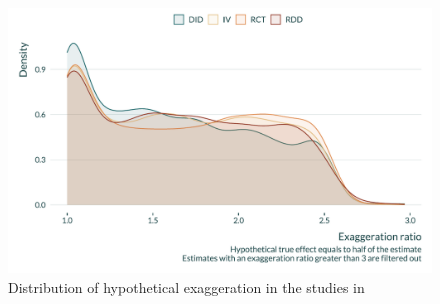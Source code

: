 \documentclass[usletter, 12pt]{article}
\begin{document}
                 \begin{figure}[h!]
                    \caption{Distribution of hypothetical exaggeration in the studies in \cite{brodeur_methods_2020}}
                        \label{exagg_brodeur}
                    \centering
                    \includegraphics[width=0.8\linewidth]{images/exagg_brodeur.pdf}
                \end{figure}                
	
	
	
		
\end{document}
